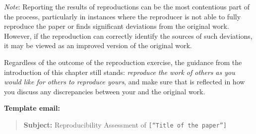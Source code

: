 \documentclass[]{book}
\begin{document}
\emph{Note}: Reporting the results of reproductions can be the most contentious part of the process, particularly in instances where the reproducer is not able to fully reproduce the paper or finds significant deviations from the original work. However, if the reproduction can correctly identify the sources of such deviations, it may be viewed as an improved version of the original work.

Regardless of the outcome of the reproduction exercise, the guidance from the introduction of this chapter still stands: \emph{reproduce the work of others as you would like for others to reproduce yours}, and make sure that is reflected in how you discuss any discrepancies between your and the original work.

\textbf{Template email:}

\begin{quote}
\textbf{Subject:} Reproducibility Assessment of \texttt{{[}“Title\ of\ the\ paper”{]}}
\end{quote}
\end{document}
